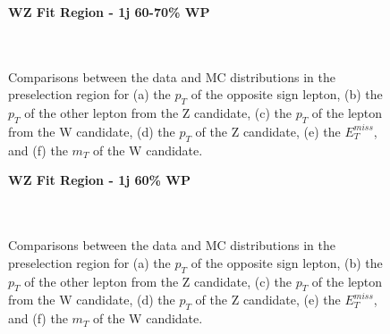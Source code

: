\begin{figure}[H] 
    \centering
    \textbf{WZ Fit Region - 1j 60-70\% WP}\\
    \\
    \\
    \caption{Comparisons between the data and MC distributions in the preselection region for (a) the $p_T$ of the opposite sign lepton, (b) the $p_T$ of the other lepton from the Z candidate, (c) the $p_T$ of the lepton from the W candidate, (d) the $p_T$ of the Z candidate, (e) the $E_T^{miss}$, and (f) the $m_T$ of the W candidate.}
    \label{kin:WP_1j_60_70}
\end{figure}

\begin{figure}[H] 
    \centering
    \textbf{WZ Fit Region - 1j 60\% WP}\\
     \\
    \\
    \caption{Comparisons between the data and MC distributions in the preselection region for (a) the $p_T$ of the opposite sign lepton, (b) the $p_T$ of the other lepton from the Z candidate, (c) the $p_T$ of the lepton from the W candidate, (d) the $p_T$ of the Z candidate, (e) the $E_T^{miss}$, and (f) the $m_T$ of the W candidate.}
    \label{kin:WP_1j_60}    
\end{figure}

